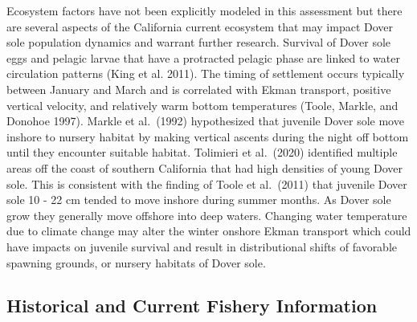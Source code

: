 \documentclass[11pt,
  english,
  a4paper,
]{article}
\begin{document}
\leavevmode\tagmcend\tagstructend


Ecosystem factors have not been explicitly modeled in this assessment but there are several aspects of the California current ecosystem that may impact Dover sole population dynamics and warrant further research. Survival of Dover sole eggs and pelagic larvae that have a protracted pelagic phase are linked to water circulation patterns {(King et al. 2011)\leavevmode\tagmcend\tagstructend}. The timing of settlement occurs typically between January and March and is correlated with Ekman transport, positive vertical velocity, and relatively warm bottom temperatures {(Toole, Markle, and Donohoe 1997)\leavevmode\tagmcend\tagstructend}. Markle et al.~{(1992)\leavevmode\tagmcend\tagstructend} hypothesized that juvenile Dover sole move inshore to nursery habitat by making vertical ascents during the night off bottom until they encounter suitable habitat. Tolimieri et al.~{(2020)\leavevmode\tagmcend\tagstructend} identified multiple areas off the coast of southern California that had high densities of young Dover sole. This is consistent with the finding of Toole et al.~{(2011)\leavevmode\tagmcend\tagstructend} that juvenile Dover sole 10 - 22 cm tended to move inshore during summer months. As Dover sole grow they generally move offshore into deep waters. Changing water temperature due to climate change may alter the winter onshore Ekman transport which could have impacts on juvenile survival and result in distributional shifts of favorable spawning grounds, or nursery habitats of Dover sole.

\leavevmode\tagmcend\tagstructend\par


\hypertarget{historical-and-current-fishery-information}{%
\subsection{Historical and Current Fishery Information}\label{historical-and-current-fishery-information}}

\leavevmode\tagmcend\tagstructend
\end{document}
